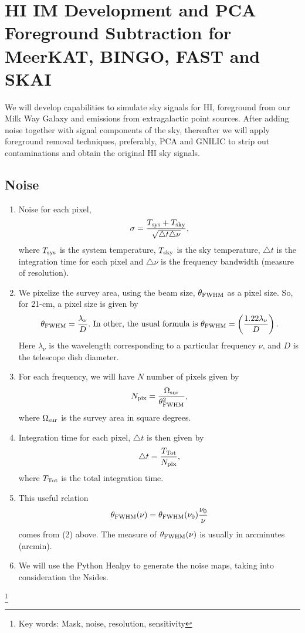 \chapter[HI IM Development]{HI IM Development and PCA Foreground Subtraction for MeerKAT, BINGO, FAST and SKAI}
We will develop capabilities to simulate sky signals for HI, foreground from our Milk Way Galaxy and emissions from extragalactic point sources. After adding noise together with signal components of the sky, 
thereafter we will apply foreground removal techniques, preferably, PCA and GNILIC to strip out contaminations and obtain the original HI sky signals.

\section{Noise}
\begin{enumerate}
 \item Noise for each pixel, 
 \begin{equation}
  \sigma = \frac{T_{\rm sys} + T_{\rm sky}}{\sqrt{\triangle t \triangle \nu}},
 \end{equation}
where $T_{\rm sys}$ is the system temperature, $T_{\rm sky}$ is the sky temperature, $\triangle t$ is the integration time for each pixel and $\triangle \nu$ is the frequency bandwidth (measure of resolution).
\item We pixelize the survey area, using the beam size, $\theta_{\rm FWHM}$ as a pixel size. So, for 21-cm, a pixel size is given by
\begin{equation}
 \theta_{\rm FWHM} = \frac{\lambda_{\nu}}{D}. \ \text{In other, the usual formula is} \ \theta_{\rm FWHM} = \left(\frac{1.22 \lambda_{\nu}}{D} \right).
\end{equation}
Here $\lambda_{\nu}$ is the wavelength corresponding to a particular frequency $\nu$, and $D$ is the telescope dish diameter.

\item For each frequency, we will have $N$ number of pixels given by
\begin{equation}
 N_{\rm pix} = \frac{\Omega_{\rm sur}}{\theta_{\rm FWHM}^{2}},
\end{equation}
where $\Omega_{\rm sur}$ is the survey area in square degrees.

\item Integration time for each pixel, $\triangle t$ is then given by
\begin{equation}
 \triangle t = \frac{T_{\rm Tot}}{N_{\rm pix}},
\end{equation}
where $T_{\rm Tot}$ is the total integration time.
\item This useful relation 
\begin{equation}
 \theta_{\rm FWHM}(\nu) = \theta_{\rm FWHM}(\nu_{0}) \frac{\nu_{0}}{\nu}
\end{equation}
comes from (2) above. The measure of $\theta_{\rm FWHM}(\nu)$ is usually in arcminutes (arcmin).
\item We will use the Python Healpy to generate the noise maps, taking into consideration the Nsides.
\end{enumerate}
\footnote{Key words: Mask, noise, resolution, sensitivity}

